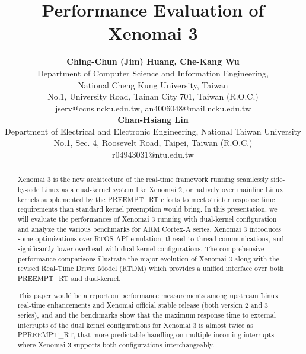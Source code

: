 \documentclass[10pt,a4paper]{article}
\title{\LARGE
Performance Evaluation of Xenomai 3
}
\author{\large
{\bf Ching-Chun (Jim) Huang, Che-Kang Wu }\\
Department of Computer Science and Information Engineering, \\
National Cheng Kung University, Taiwan\\
No.1, University Road, Tainan City 701, Taiwan (R.O.C.)\\
\vspace{8mm}
jserv$@$ccns.ncku.edu.tw, an4006048$@$mail.ncku.edu.tw\\
{\bf Chan-Hsiang Lin}\\
Department of Electrical and Electronic Engineering, National Taiwan University\\
No.1, Sec. 4, Roosevelt Road, Taipei, Taiwan (R.O.C.)\\
\vspace{8mm}
r04943031$@$ntu.edu.tw\\
}
\date{}
\begin{document}
\maketitle

\begin{abstract}
Xenomai 3 is the new architecture of the real-time framework running seamlessly side-by-side Linux as a dual-kernel system like Xenomai 2, or natively over mainline Linux kernels supplemented by the PREEMPT\_RT efforts to meet stricter response time requirements than standard kernel preemption would bring. In this presentation, we will evaluate the performances of Xenomai 3 running with dual-kernel configuration and analyze the various benchmarks for ARM Cortex-A series. Xenomai 3 introduces some optimizations over RTOS API emulation, thread-to-thread communications, and significantly lower overhead with dual-kernel configurations. The comprehensive performance comparisons illustrate the major evolution of Xenomai 3 along with the revised Real-Time Driver Model (RTDM) which provides a unified interface over both PREEMPT\_RT and dual-kernel.

This paper would be a report on performance measurements among upstream Linux real-time enhancements and Xenomai official stable release (both version 2 and 3 series), and and the benchmarks show that the maximum response time to external interrupts of the dual kernel configurations for Xenomai 3 is almost twice as PPREEMPT\_RT, that more predictable handling on multiple incoming interrupts where Xenomai 3 supports both configurations interchangeably.
\end{abstract}

\vspace{10mm}
\end{document}
